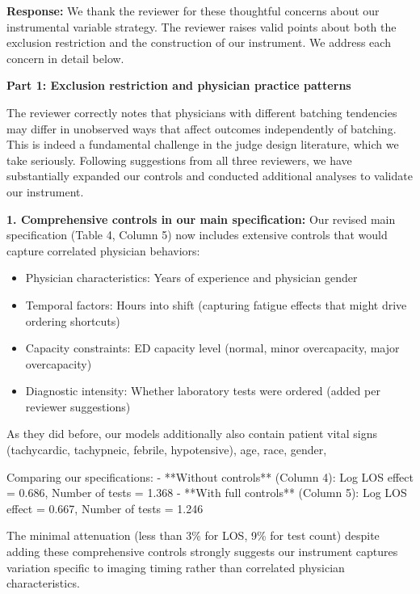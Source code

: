 \documentclass[11pt]{article}
\newcommand{\1}{\hbox{\rm 1\kern-.35em 1}}
\begin{document}
{{{{\noindent\textbf{Response:} \color{blue}
We thank the reviewer for these thoughtful concerns about our instrumental variable strategy. The reviewer raises valid points about both the exclusion restriction and the construction of our instrument. We address each concern in detail below.

\textbf{Part 1: Exclusion restriction and physician practice patterns}

The reviewer correctly notes that physicians with different batching tendencies may differ in unobserved ways that affect outcomes independently of batching. This is indeed a fundamental challenge in the judge design literature, which we take seriously. Following suggestions from all three reviewers, we have substantially expanded our controls and conducted additional analyses to validate our instrument.

\textbf{1. Comprehensive controls in our main specification:}
Our revised main specification (Table 4, Column 5) now includes extensive controls that would capture correlated physician behaviors:

\begin{itemize}
 
\item Physician characteristics: Years of experience and physician gender

\item Temporal factors: Hours into shift (capturing fatigue effects that might drive ordering shortcuts)

\item Capacity constraints: ED capacity level (normal, minor overcapacity, major overcapacity)

\item Diagnostic intensity: Whether laboratory tests were ordered (added per reviewer suggestions)
\end{itemize}

As they did before, our models additionally also contain patient vital signs (tachycardic, tachypneic, febrile, hypotensive), age, race,
gender,

Comparing our specifications:
- **Without controls** (Column 4): Log LOS effect = 0.686, Number of tests = 1.368
- **With full controls** (Column 5): Log LOS effect = 0.667, Number of tests = 1.246

The minimal attenuation (less than 3\% for LOS, 9\% for test count) despite adding these comprehensive controls strongly suggests our instrument captures variation specific to imaging timing rather than correlated physician characteristics.

}}}}
\end{document}
